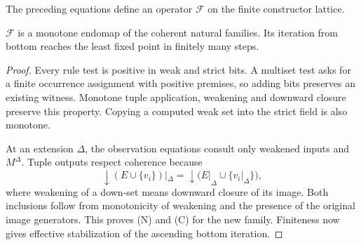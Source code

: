 The preceding equations define an operator $\mathcal F$ on the finite
constructor lattice.

\begin{lemma}\label{lem:operator}
$\mathcal F$ is a monotone endomap of the coherent natural families.
Its iteration from bottom reaches the least fixed point in finitely
many steps.
\end{lemma}
\begin{proof}
Every rule test is positive in weak and strict bits. A multiset test
asks for a finite occurrence assignment with positive premises, so
adding bits preserves an existing witness. Monotone tuple application,
weakening and downward closure preserve this property. Copying a
computed weak set into the strict field is also monotone.

At an extension $\Delta$, the observation equations consult only
weakened inputs and $M^\Delta$. Tuple outputs respect coherence because
\[
 \downarrow(E\cup\{v_i\})|_\Delta
 =\downarrow\bigl(E|_\Delta\cup\{v_i|_\Delta\}\bigr),
\]
where weakening of a down-set means downward closure of its image.
Both inclusions follow from monotonicity of weakening and the presence
of the original image generators. This proves (N) and (C) for the
new family. Finiteness now gives effective stabilization of the
ascending bottom iteration.
\end{proof}

